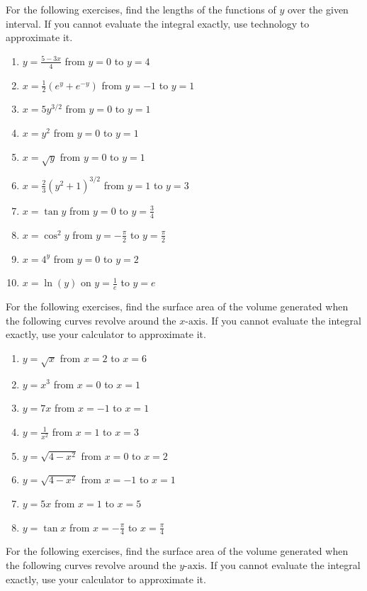 \documentclass{exercises}
\begin{document}
For the following exercises, find the lengths of the functions of $y$ over the given interval. If you cannot evaluate the integral exactly, use technology to approximate it.

\begin{enumerate}[resume]
\item $y=\frac{5-3x}{4}$ from $y=0$ to $y=4$
\item $x=\frac{1}{2}(e^{y}+e^{-y})$ from $y=-1$ to $y=1$
\item $x=5y^{3/2}$ from $y=0$ to $y=1$
\item \techrequired $x=y^{2}$ from $y=0$ to $y=1$
\item $x=\sqrt{y}$ from $y=0$ to $y=1$
\item $x=\frac{2}{3}(y^{2}+1)^{3/2}$ from $y=1$ to $y=3$
\item \techrequired $x=\tan y$ from $y=0$ to $y=\frac{3}{4}$
\item \techrequired $x=\cos^{2}y$ from $y=-\frac{\pi}{2}$ to $y=\frac{\pi}{2}$
\item \techrequired $x=4^{y}$ from $y=0$ to $y=2$
\item \techrequired $x=\ln(y)$ on $y=\frac{1}{e}$ to $y=e$
\end{enumerate}

For the following exercises, find the surface area of the volume generated when the following curves revolve around the $x\text{-axis}$. If you cannot evaluate the integral exactly, use your calculator to approximate it.

\begin{enumerate}[resume]
\item $y=\sqrt{x}$ from $x=2$ to $x=6$
\item $y=x^{3}$ from $x=0$ to $x=1$
\item $y=7x$ from $x=-1$ to $x=1$
\item \techrequired $y=\frac{1}{x^{2}}$ from $x=1$ to $x=3$
\item $y=\sqrt{4-x^{2}}$ from $x=0$ to $x=2$
\item $y=\sqrt{4-x^{2}}$ from $x=-1$ to $x=1$
\item $y=5x$ from $x=1$ to $x=5$
\item \techrequired $y=\tan x$ from $x=-\frac{\pi}{4}$ to $x=\frac{\pi}{4}$
\end{enumerate}

For the following exercises, find the surface area of the volume generated when the following curves revolve around the $y\text{-axis}$. If you cannot evaluate the integral exactly, use your calculator to approximate it.
\end{document}
